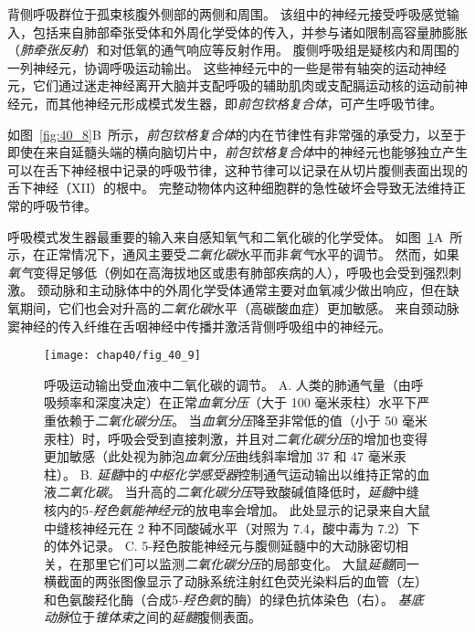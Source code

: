 背侧呼吸群位于孤束核腹外侧部的两侧和周围。
该组中的神经元接受呼吸感觉输入，包括来自肺部牵张受体和外周化学受体的传入，并参与诸如限制高容量肺膨胀（\textit{肺牵张反射}）和对低氧的通气响应等反射作用。
腹侧呼吸组是疑核内和周围的一列神经元，协调呼吸运动输出。
这些神经元中的一些是带有轴突的运动神经元，它们通过迷走神经离开大脑并支配呼吸的辅助肌肉或支配膈运动核的运动前神经元，而其他神经元形成模式发生器，即\textit{前包钦格复合体}，可产生呼吸节律。


如图~\ref{fig:40_8}B~所示，\textit{前包钦格复合体}的内在节律性有非常强的承受力，以至于即使在来自延髓头端的横向脑切片中，\textit{前包钦格复合体}中的神经元也能够独立产生可以在舌下神经根中记录的呼吸节律，这种节律可以记录在从切片腹侧表面出现的舌下神经（XII）的根中。
完整动物体内这种细胞群的急性破坏会导致无法维持正常的呼吸节律。


呼吸模式发生器最重要的输入来自感知氧气和二氧化碳的化学受体。
如图~\ref{fig:40_9}A~所示，在正常情况下，通风主要受\textit{二氧化碳}水平而非\textit{氧气}水平的调节。
然而，如果\textit{氧气}变得足够低（例如在高海拔地区或患有肺部疾病的人），呼吸也会受到强烈刺激。
颈动脉和主动脉体中的外周化学受体通常主要对血氧减少做出响应，但在缺氧期间，它们也会对升高的\textit{二氧化碳}水平（高碳酸血症）更加敏感。
来自颈动脉窦神经的传入纤维在舌咽神经中传播并激活背侧呼吸组中的神经元。


\begin{figure}[htbp]
	\centering
	\texttt{[image: chap40/fig\_40\_9]}
	\caption{呼吸运动输出受血液中二氧化碳的调节。
		A. 人类的肺通气量（由呼吸频率和深度决定）在正常\textit{血氧分压}（大于 100 毫米汞柱）水平下严重依赖于\textit{二氧化碳分压}。
		当\textit{血氧分压}降至非常低的值（小于 50 毫米汞柱）时，呼吸会受到直接刺激，并且对\textit{二氧化碳分压}的增加也变得更加敏感（此处视为肺泡\textit{血氧分压}曲线斜率增加 37 和 47 毫米汞柱）。
		B. \textit{延髓}中的\textit{中枢化学感受器}控制通气运动输出以维持正常的血液\textit{二氧化碳}。
		当升高的\textit{二氧化碳分压}导致酸碱值降低时，\textit{延髓}中缝核内的5\textit{-羟色氨能神经元}的放电率会增加。
		此处显示的记录来自大鼠中缝核神经元在 2 种不同酸碱水平（对照为 7.4，酸中毒为 7.2）下的体外记录\cite{wang2002quantification}。
		C. 5-羟色胺能神经元与腹侧延髓中的大动脉密切相关，在那里它们可以监测\textit{二氧化碳分压}的局部变化。
		大鼠\textit{延髓}同一横截面的两张图像显示了动脉系统注射红色荧光染料后的血管（左）和色氨酸羟化酶（合成5\textit{-羟色氨}的酶）的绿色抗体染色（右）。
		\textit{基底动脉}位于\textit{锥体束}之间的\textit{延髓}腹侧表面\cite{bradley2002chemosensitive}。}
	\label{fig:40_9}
\end{figure}


